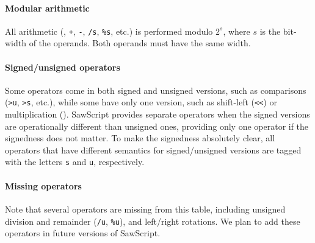 \documentclass[12pt]{galois-whitepaper}
\newcommand{\sawScript}{{\sc SawScript}\xspace}
\begin{document}
\paragraph{Modular arithmetic} All arithmetic ({\tt *}, {\tt +}, {\tt -}, {\tt /s}, {\tt \%s}, etc.) 
is performed modulo $2^s$, where $s$ is the bit-width of the operands. Both operands must have the same width.

\paragraph{Signed/unsigned operators} Some operators come in both signed and unsigned versions, such as comparisons ({\tt >u}, {\tt >s}, 
etc.), while some have only one version, such as shift-left ({\tt <<}) or multiplication ({\tt *}). \sawScript provides separate
operators when the signed versions are operationally different than unsigned ones, providing only
one operator if the signedness does not matter. To make the signedness absolutely
clear, all operators that have different semantics for signed/unsigned versions are tagged with the letters {\tt s} and {\tt u}, respectively.

\paragraph{Missing operators} Note that several operators are missing from this table, including unsigned division and remainder
({\tt /u}, {\tt \%u}), and left/right rotations. We plan to add these operators in future versions of \sawScript.

\newpage


\end{document}
